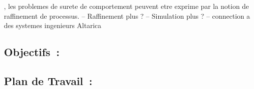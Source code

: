 \documentclass[a4paper,10pt]{article}
\begin{document}
, les problemes de surete de comportement
peuvent etre exprime par la notion de raffinement de processus.
-- Raffinement plus ?
-- Simulation plus ?
-- connection a des systemes ingenieurs Altarica

%
%

\subsection*{Objectifs~:}

\subsection*{Plan de Travail~:}




\end{document}
